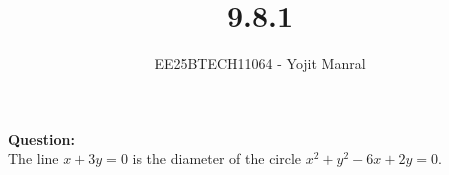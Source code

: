 \documentclass[journal]{IEEEtran}
\begin{document}

\vspace{3cm}

\title{9.8.1}
\author{EE25BTECH11064 - Yojit Manral}

\maketitle
{\let\newpage\relax\maketitle}
\renewcommand{\thefigure}{\theenumi}
\renewcommand{\thetable}{\theenumi}
\setlength{\intextsep}{10pt} %

\textbf{Question:}\\
The line $x + 3y = 0$ is the diameter of the circle $x^2 + y^2 - 6x + 2y = 0$.
\end{document}
